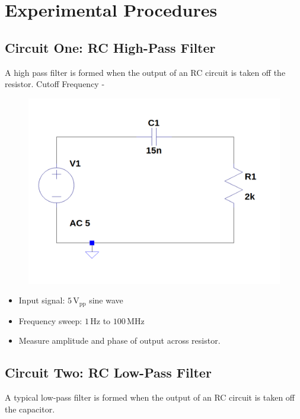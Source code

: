 \documentclass[12pt]{article}
\begin{document}
\section{Experimental Procedures}
\subsection{Circuit One: RC High-Pass Filter}
A high pass filter is formed when the output of an RC circuit is taken off the
resistor. 
Cutoff Frequency - 
\begin{figure}[H]
	\includegraphics[width=\textwidth]{e6_01}
\end{figure}

\begin{itemize}
	\item Input signal: $5\,\mathrm{V_{pp}}$ sine wave
	\item Frequency sweep: $1\,\mathrm{Hz}$ to $100\,\mathrm{MHz}$
	\item Measure amplitude and phase of output across resistor.
\end{itemize}

\subsection{Circuit Two: RC Low-Pass Filter}
A typical low-pass filter is formed when the output of an RC circuit is taken
off the capacitor.
\end{document}
